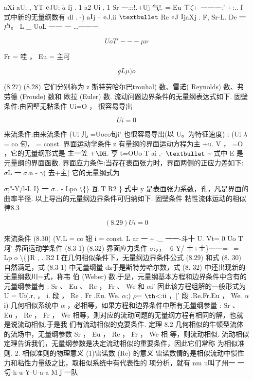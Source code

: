 aXi aU; , YT ${\rm e}$JU; $\tilde{a}$ fj . 1 a2 Ui , 1 Sr 一:::!.+Uj 气!. =-Eu 工$\zeta$+ 一一一:' +:.. f 式中新的无量纲数有 dl . -) a${\rm I}$j -- ${\rm e}$J.ii ${\rm •}$ Re ${\rm e}$J ${\rm I}$jaXj . F, Sr-L. De 一卢。 L \_ UoL 一一 一 …一一一

\[Uo T' ---\mu \nu \]

Fr = 哇 ， Eu = 主可

\[gL\mu )o\]

(8.27) (8.28) 它们分别称为 z 斯特劳哈尔巴trouhal) 数、雷诺( Reynolds) 数、弗劳德 (Froude) 数和 欧拉 (Euler) 数. 流动问题边界条件的无量纲表达式如下. 固壁条件:由固壁无粘条件 Ui=O ， 很容易导出

\[Ui = 0\]

来流条件:由来流条件 (Ui 儿 =Uoco旬i' 也很容易导出(以 U。为特征速度) : (Ui $\lambda$ = co 旬， = const. 界面运动学条件 z 有量纲的界面运动方程为主 +u. V ， =O ，它的无量纲形式是 主一笠 +${\rm Ð}$. 亨 t=OUo T ai ,- ${\rm •}$ \textasciitilde{} 式中 E 是元量纲的界面函数. 界面应力条件:当存在表面张力时，界面两侧的正应力差如下: $\sigma$L 一 $\sigma$.n - $\gamma$( 去+主) 它的无量纲式为

$\sigma$;"-Y/l-L I\} 一 $\sigma$.. - Lpo \textbackslash\{\} 瓦 T R2 \} 式中 y 是表面张力系数，孔，凡是界面的曲率半径. 以上导出的元量纲边界条件可归纳如下. 固壁条件 粘性流体运动的相似律8.3

\[(8.29) Ui = 0\]

来流条件 (8.30) (V,L = co 钮 i = const. L ar 一 \textasciitilde{} .\_ 一一-斗十 U. Vt= 0 Uo T 坷' 界面运动学条件 (8.3 1) (8.32) 界面应力条件 $\sigma$:，， -6-Y/ 土+土\}一一=-- =-- Lp o \textbackslash\{\}R , . R2 I 在几何相似条件下，无量纲边界条件公式 (8.29) 和式 (8. 30) 自然满足，式 (8.3 1) 中无量纲量 dz于是斯特劳哈尔数，式 (8. 32) 中还出现新的无量纲数川=式，称韦 伯 (Weber) 数.于是，元量纲基本方程和边界条件中含有的元量纲参量有 : Sr 、 Eu 、 Re ， Fr 、 We 和 $\alpha$i' 因此该方程组解的一般形式为 U = Ui(.r, ， i. 段 ， Re , Fr .Eu. We. $\alpha$;) $\rho$= ${\rm þ}$<:ii ，[' 段 .Re.Fr.Eu ， We. $\alpha$i) 几何相似系统中 $\alpha$ ，必相等，如果方程和边界条件中所有无量纲参量 : Sr 、 Eu ， Re ， Fr ， We 相等，则对应的流动问题的无量纲方程有相同的解，也就是说流动相似.于是我 们有流动相似的克要条件. 定理 8.2 几何相似的牛顿型流体的流场中，无量纲参数 Sr ， Eu ， Re ， Fr ， We 相 等，则流动相似. 流动相似定理告诉我们，无量纲参数是决定流动相似的重要条件，因此它们常称 为相似准则. 2. 相似准则的物理意义 (1)雷诺数 (Re) 的意义 雷诺数情的是相似流动中惯性力和粘性力量级之比，取相似系统中有代表性的 项分析，就有 nm u叫了州一 一切-h-u-Y-U-a-a M丁一队

